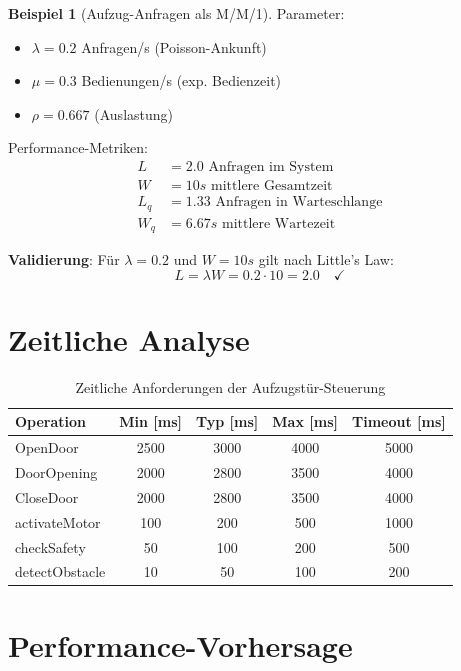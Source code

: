﻿\documentclass[a4paper,12pt]{report}
\theoremstyle{definition}
\newtheorem{beispiel}{Beispiel}[section]
\begin{document}
\begin{beispiel}[Aufzug-Anfragen als M/M/1]
	Parameter:
	\begin{itemize}
		\item[-] $\lambda = 0.2$ Anfragen/s (Poisson-Ankunft)
		\item[-] $\mu = 0.3$ Bedienungen/s (exp. Bedienzeit)
		\item[-] $\rho = 0.667$ (Auslastung)
	\end{itemize}
	
	Performance-Metriken:
	\begin{align*}
		L &= 2.0 \text{ Anfragen im System} \\
		W &= 10s \text{ mittlere Gesamtzeit} \\
		L_q &= 1.33 \text{ Anfragen in Warteschlange} \\
		W_q &= 6.67s \text{ mittlere Wartezeit}
	\end{align*}
	
	\textbf{Validierung}: Für $\lambda = 0.2$ und $W = 10s$ gilt nach Little's Law:
	\[
	L = \lambda W = 0.2 \cdot 10 = 2.0 \quad \checkmark
	\]
\end{beispiel}

\section{Zeitliche Analyse}

\begin{table}[h]
	\centering
	\begin{tabular}{@{}lcccc@{}}
		\toprule
		\textbf{Operation} & \textbf{Min [ms]} & \textbf{Typ [ms]} & \textbf{Max [ms]} & \textbf{Timeout [ms]} \\
		\midrule
		OpenDoor & 2500 & 3000 & 4000 & 5000 \\
		DoorOpening & 2000 & 2800 & 3500 & 4000 \\
		CloseDoor & 2000 & 2800 & 3500 & 4000 \\
		activateMotor & 100 & 200 & 500 & 1000 \\
		checkSafety & 50 & 100 & 200 & 500 \\
		detectObstacle & 10 & 50 & 100 & 200 \\
		\bottomrule
	\end{tabular}
	\caption{Zeitliche Anforderungen der Aufzugstür-Steuerung}
	\label{tab:timing-analysis}
\end{table}

\section{Performance-Vorhersage}
\end{document}
